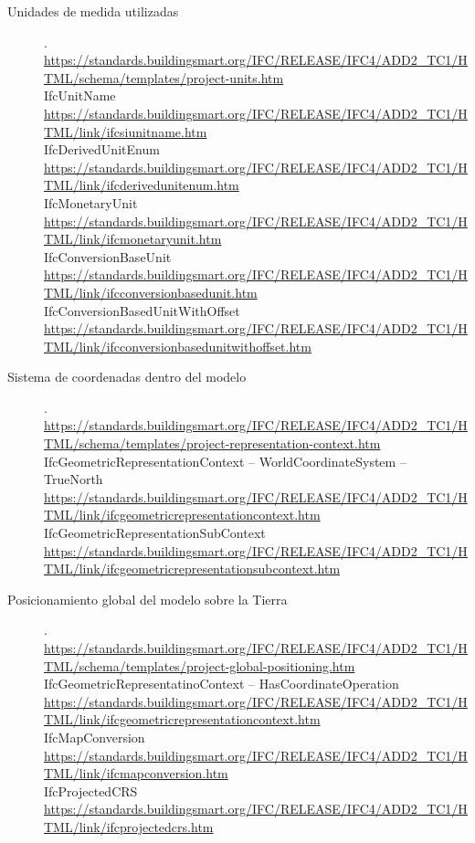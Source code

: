 \documentclass[spanish,12pt,a4paper,final,oneside]{book}
\begin{document}
\begin{description}

\item[Unidades de medida utilizadas].
\\ \url{https://standards.buildingsmart.org/IFC/RELEASE/IFC4/ADD2_TC1/HTML/schema/templates/project-units.htm}
\\IfcUnitName
\\ \url{https://standards.buildingsmart.org/IFC/RELEASE/IFC4/ADD2_TC1/HTML/link/ifcsiunitname.htm}
\\IfcDerivedUnitEnum
\\ \url{https://standards.buildingsmart.org/IFC/RELEASE/IFC4/ADD2_TC1/HTML/link/ifcderivedunitenum.htm}
\\IfcMonetaryUnit
\\ \url{https://standards.buildingsmart.org/IFC/RELEASE/IFC4/ADD2_TC1/HTML/link/ifcmonetaryunit.htm}
\\IfcConversionBaseUnit
\\ \url{https://standards.buildingsmart.org/IFC/RELEASE/IFC4/ADD2_TC1/HTML/link/ifcconversionbasedunit.htm}
\\IfcConversionBasedUnitWithOffset
\\ \url{https://standards.buildingsmart.org/IFC/RELEASE/IFC4/ADD2_TC1/HTML/link/ifcconversionbasedunitwithoffset.htm}


\item[Sistema de coordenadas dentro del modelo].
\\ \url{https://standards.buildingsmart.org/IFC/RELEASE/IFC4/ADD2_TC1/HTML/schema/templates/project-representation-context.htm}
\\IfcGeometricRepresentationContext -- WorldCoordinateSystem -- TrueNorth
\\ \url{https://standards.buildingsmart.org/IFC/RELEASE/IFC4/ADD2_TC1/HTML/link/ifcgeometricrepresentationcontext.htm}
\\IfcGeometricRepresentationSubContext
\\ \url{https://standards.buildingsmart.org/IFC/RELEASE/IFC4/ADD2_TC1/HTML/link/ifcgeometricrepresentationsubcontext.htm}


\item[Posicionamiento global del modelo sobre la Tierra].
\\ \url{https://standards.buildingsmart.org/IFC/RELEASE/IFC4/ADD2_TC1/HTML/schema/templates/project-global-positioning.htm}
\\IfcGeometricRepresentatinoContext -- HasCoordinateOperation
\\ \url{https://standards.buildingsmart.org/IFC/RELEASE/IFC4/ADD2_TC1/HTML/link/ifcgeometricrepresentationcontext.htm}
\\IfcMapConversion
\\ \url{https://standards.buildingsmart.org/IFC/RELEASE/IFC4/ADD2_TC1/HTML/link/ifcmapconversion.htm}
\\IfcProjectedCRS
\\ \url{https://standards.buildingsmart.org/IFC/RELEASE/IFC4/ADD2_TC1/HTML/link/ifcprojectedcrs.htm}



\end{description}
\end{document}
